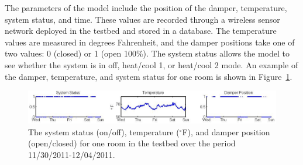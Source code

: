 


The parameters of the model include the position of the damper, temperature,
system status, and time. These values are recorded through a wireless sensor
network deployed in the testbed and stored in a database. The temperature values
are measured in degrees Fahrenheit, and the damper positions take one of two
values: 0 (closed) or 1 (open 100\%). The system status allows the model to see
whether the system is in off, heat/cool 1, or heat/cool 2 mode. An example of
the damper, temperature, and system status for one room is shown in
Figure~\ref{parameters}.

\begin{figure}
\begin{center}
\includegraphics[width=0.8\columnwidth]{fig/parameters.eps}
\end{center}
\caption[Example system parameters collected over one week]{The system status
(on/off), temperature ($^{\circ}$F), and damper position (open/closed) for one
room in the testbed over the period 11/30/2011-12/04/2011.}
\label{parameters}
\end{figure}

